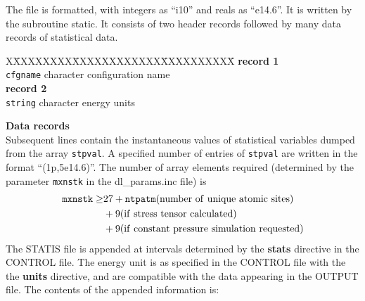 The file is formatted, with integers as ``i10'' and reals as
``e14.6''.  It is written by the subroutine {\sc static}. It consists
of two header records followed by many data records of statistical
data.
\begin{tabbing}
X\=XXXXXXXX\=XXXXXXXXXXXX\=XXXXXXXXXX\=\kill
{\bf record 1}\\
\> {\tt cfgname} \> character \> configuration name\\
{\bf record 2}\\
\> {\tt string} \> character \> energy units\\
\end{tabbing}

{\bf Data records}\\ Subsequent lines contain the instantaneous values
of statistical variables dumped from the array {\tt stpval}. A
specified number of
entries of {\tt stpval} are written in the format ``(1p,5e14.6)''. 
The number of array elements required (determined by the parameter
{\tt mxnstk} in
the {\sc dl\_params.inc} file) is
\begin{eqnarray}
{\tt mxnstk} \ge& 27  + {\tt ntpatm} (\rm
number~of~unique~atomic~sites) \nonumber\\
                & +  9 (\rm if~stress~tensor~calculated) \nonumber\\
                & +  9 (\rm if~constant~pressure~simulation~requested)
\nonumber
\end{eqnarray}
The STATIS file is appended at intervals determined by the
{\bf stats} directive in the CONTROL file. The energy
unit is as specified in the CONTROL file with the the {\bf units}
directive, and are compatible with the data appearing in the OUTPUT
file.  The contents of the appended information is:
